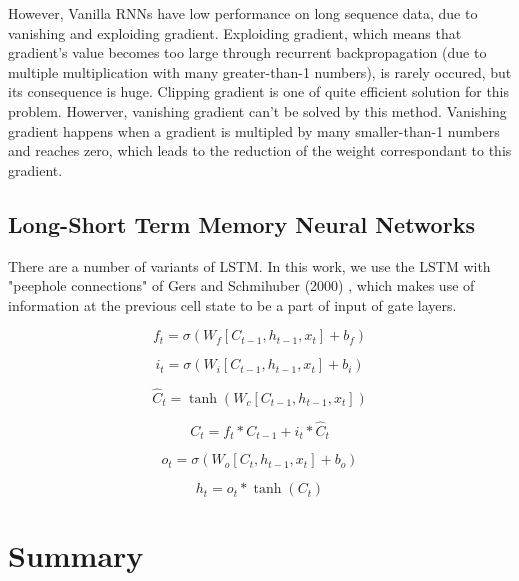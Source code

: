 However, Vanilla RNNs have low performance on long sequence data, due to vanishing and exploiding gradient. Exploiding gradient, which means that gradient's value becomes too large through recurrent backpropagation (due to multiple multiplication with many greater-than-1 numbers), is rarely occured, but its consequence is huge. Clipping gradient is one of quite efficient solution for this problem. Howerver, vanishing gradient can't be solved by this method. Vanishing gradient happens when a gradient is multipled by many smaller-than-1 numbers and reaches zero, which leads to the reduction of the weight correspondant to this gradient.

\subsection{Long-Short Term Memory Neural Networks}
There are a number of variants of LSTM. In this work, we use the LSTM with "peephole connections" of Gers and Schmihuber (2000) %
, which makes use of information at the previous cell state to be a part of input of gate layers.

\[ f_t = \sigma(W_f[C_{t-1}, h_{t-1},x_t] + b_f) \]

\[ i_t = \sigma(W_i[C_{t-1}, h_{t-1},x_t] + b_i) \]

\[ \hat{C}_t = \tanh(W_c[C_{t-1}, h_{t-1},x_t]) \]

\[ C_t = f_t * C_{t-1} + i_t * \hat{C}_t \]

\[ o_t = \sigma(W_o[C_{t}, h_{t-1},x_t] + b_o) \]

\[ h_t = o_t * \tanh(C_t) \]

\section{Summary}
